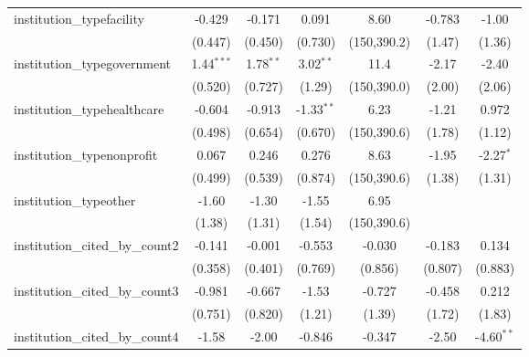 \begin{tabular}{lcccccc}
   institution\_typefacility             & -0.429        & -0.171        & 0.091         & 8.60          & -0.783        & -1.00\\   
                                         & (0.447)       & (0.450)       & (0.730)       & (150,390.2)   & (1.47)        & (1.36)\\   
   institution\_typegovernment           & 1.44$^{***}$  & 1.78$^{**}$   & 3.02$^{**}$   & 11.4          & -2.17         & -2.40\\   
                                         & (0.520)       & (0.727)       & (1.29)        & (150,390.0)   & (2.00)        & (2.06)\\   
   institution\_typehealthcare           & -0.604        & -0.913        & -1.33$^{**}$  & 6.23          & -1.21         & 0.972\\   
                                         & (0.498)       & (0.654)       & (0.670)       & (150,390.6)   & (1.78)        & (1.12)\\   
   institution\_typenonprofit            & 0.067         & 0.246         & 0.276         & 8.63          & -1.95         & -2.27$^{*}$\\   
                                         & (0.499)       & (0.539)       & (0.874)       & (150,390.6)   & (1.38)        & (1.31)\\   
   institution\_typeother                & -1.60         & -1.30         & -1.55         & 6.95          &               &   \\   
                                         & (1.38)        & (1.31)        & (1.54)        & (150,390.6)   &               &   \\   
   institution\_cited\_by\_count2        & -0.141        & -0.001        & -0.553        & -0.030        & -0.183        & 0.134\\   
                                         & (0.358)       & (0.401)       & (0.769)       & (0.856)       & (0.807)       & (0.883)\\   
   institution\_cited\_by\_count3        & -0.981        & -0.667        & -1.53         & -0.727        & -0.458        & 0.212\\   
                                         & (0.751)       & (0.820)       & (1.21)        & (1.39)        & (1.72)        & (1.83)\\   
   institution\_cited\_by\_count4        & -1.58         & -2.00         & -0.846        & -0.347        & -2.50         & -4.60$^{**}$\\   

\end{tabular}

